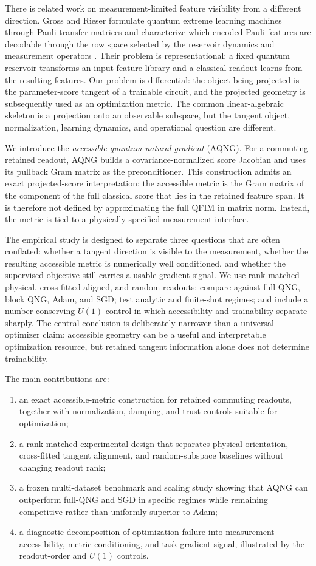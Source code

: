 There is related work on measurement-limited feature visibility from a different direction. Gross and Rieser formulate quantum extreme learning machines through Pauli-transfer matrices and characterize which encoded Pauli features are decodable through the row space selected by the reservoir dynamics and measurement operators \cite{GrossRieser2026}. Their problem is representational: a fixed quantum reservoir transforms an input feature library and a classical readout learns from the resulting features. Our problem is differential: the object being projected is the parameter-score tangent of a trainable circuit, and the projected geometry is subsequently used as an optimization metric. The common linear-algebraic skeleton is a projection onto an observable subspace, but the tangent object, normalization, learning dynamics, and operational question are different.

We introduce the \emph{accessible quantum natural gradient} (AQNG). For a commuting retained readout, AQNG builds a covariance-normalized score Jacobian and uses its pullback Gram matrix as the preconditioner. This construction admits an exact projected-score interpretation: the accessible metric is the Gram matrix of the component of the full classical score that lies in the retained feature span. It is therefore not defined by approximating the full QFIM in matrix norm. Instead, the metric is tied to a physically specified measurement interface.

The empirical study is designed to separate three questions that are often conflated: whether a tangent direction is visible to the measurement, whether the resulting accessible metric is numerically well conditioned, and whether the supervised objective still carries a usable gradient signal. We use rank-matched physical, cross-fitted aligned, and random readouts; compare against full QNG, block QNG, Adam, and SGD; test analytic and finite-shot regimes; and include a number-conserving $U(1)$ control in which accessibility and trainability separate sharply. The central conclusion is deliberately narrower than a universal optimizer claim: accessible geometry can be a useful and interpretable optimization resource, but retained tangent information alone does not determine trainability.

The main contributions are:
\begin{enumerate}
    \item an exact accessible-metric construction for retained commuting readouts, together with normalization, damping, and trust controls suitable for optimization;
    \item a rank-matched experimental design that separates physical orientation, cross-fitted tangent alignment, and random-subspace baselines without changing readout rank;
    \item a frozen multi-dataset benchmark and scaling study showing that AQNG can outperform full-QNG and SGD in specific regimes while remaining competitive rather than uniformly superior to Adam;
    \item a diagnostic decomposition of optimization failure into measurement accessibility, metric conditioning, and task-gradient signal, illustrated by the readout-order and $U(1)$ controls.
\end{enumerate}
